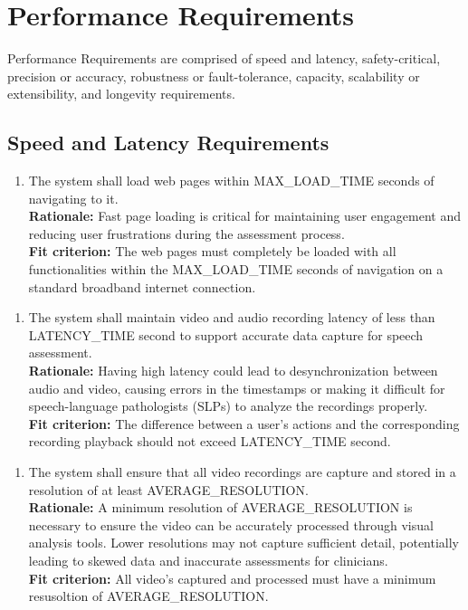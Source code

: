 \documentclass[12pt]{article}
\begin{document}
\newpage

\section{Performance Requirements}
\hspace{2em}Performance Requirements are comprised of speed and latency, safety-critical, precision or accuracy, robustness or fault-tolerance, capacity, scalability or extensibility, and longevity requirements.
\subsection{Speed and Latency Requirements}
\begin{enumerate}[label={PR-SL}1. ]
  \item The system shall load web pages within MAX\_LOAD\_TIME seconds of navigating to it.\\
  \textbf{Rationale: }Fast page loading is critical for maintaining user engagement and reducing user frustrations during the assessment process.\\
  \textbf{Fit criterion: }The web pages must completely be loaded with all functionalities within the MAX\_LOAD\_TIME seconds of navigation on a standard broadband internet connection.  
\end{enumerate}
\begin{enumerate}[label={PR-SL}2. ]
  \item The system shall maintain video and audio recording latency of less than LATENCY\_TIME second to support accurate data capture for speech assessment.\\
  \textbf{Rationale: }Having high latency could lead to desynchronization between audio and video, causing errors in the timestamps or making it difficult for speech-language pathologists (SLPs) to analyze the recordings properly.\\
  \textbf{Fit criterion: }The difference between a user's actions and the corresponding recording playback should not exceed LATENCY\_TIME second.  
\end{enumerate}
\begin{enumerate}[label={PR-SL}3. ]
  \item The system shall ensure that all video recordings are capture and stored in a resolution of at least AVERAGE\_RESOLUTION.\\
  \textbf{Rationale: }A minimum resolution of AVERAGE\_RESOLUTION is necessary to ensure the video can be accurately processed through visual analysis tools. Lower resolutions may not capture sufficient detail, potentially leading to skewed data and inaccurate assessments for clinicians.\\
  \textbf{Fit criterion: }All video's captured and processed must have a minimum resusoltion of AVERAGE\_RESOLUTION.
\end{enumerate}
\end{document}
